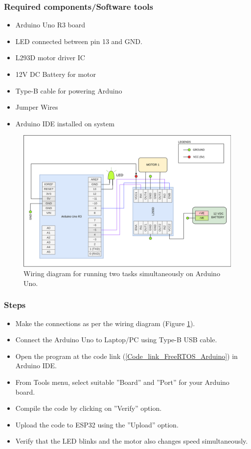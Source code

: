 \subsubsection{Required components/Software tools}
\begin{itemize}
    \item Arduino Uno R3 board
    \item LED connected between pin 13 and GND.
    \item L293D motor driver IC
    \item 12V DC Battery for motor
    \item Type-B cable for powering Arduino
    \item Jumper Wires
    \item Arduino IDE installed on system
\end{itemize}

\begin{figure}[ht]
\centering
\includegraphics[width=\columnwidth]{./Figures/Wiring_FreeRTOS_demo.png}
\caption{Wiring diagram for running two tasks simultaneously on Arduino Uno.}
\label{Wiring_FreeRTOS_demo}
\end{figure}

\subsubsection{Steps}
\begin{itemize}
    \item Make the connections as per the wiring diagram (Figure \ref{Wiring_FreeRTOS_demo}).
    \item Connect the Arduino Uno to Laptop/PC using Type-B USB cable.
    \item Open the program at the code link (\ref{Code_link_FreeRTOS_Arduino}) in Arduino IDE.
    \item From Tools menu, select suitable ”Board” and ”Port” for your Arduino board.
    \item Compile the code by clicking on ”Verify” option.
    \item Upload the code to ESP32 using the ”Upload” option.
    \item Verify that the LED blinks and the motor also changes speed simultaneously.
\end{itemize}


